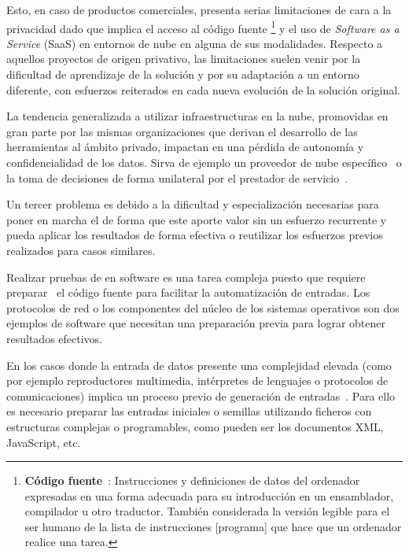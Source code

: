 \documentclass[10pt,conference,a4paper]{IEEEtran}
\begin{document}
Esto, en caso de productos comerciales, presenta serias limitaciones de cara a la privacidad dado que implica el acceso al código fuente
%
\footnote{
\textbf{Código fuente}~\cite{IEEE_SW_standar}:
Instrucciones y definiciones de datos del ordenador expresadas en una forma adecuada para su introducción en un ensamblador, compilador u otro traductor. También considerada la versión legible para el ser humano de la lista de instrucciones [programa] que hace que un ordenador realice una tarea.
}
%
y el uso de \textit{Software as a Service} (SaaS) en entornos de nube en alguna de sus modalidades. Respecto a aquellos proyectos de origen privativo, las limitaciones suelen venir por la dificultad de aprendizaje de la solución y por su adaptación a un entorno diferente, con esfuerzos reiterados en cada nueva evolución de la solución original.

La tendencia generalizada a utilizar infraestructuras en la nube, promovidas en gran parte por las mismas organizaciones que derivan el desarrollo de las herramientas al ámbito privado, impactan en una pérdida de autonomía y confidencialidad de los datos. Sirva de ejemplo un proveedor de nube específico~\cite{google_serv} o la toma de decisiones de forma unilateral por el prestador de servicio~\cite{microsoft_srv}.

Un tercer problema es debido a la dificultad y especialización necesarias para poner en marcha el {\fz} de forma que este aporte valor sin un esfuerzo recurrente y pueda aplicar los resultados de forma efectiva o reutilizar los esfuerzos previos realizados para casos similares.

Realizar pruebas de {\fz} en software es una tarea compleja puesto que requiere preparar~\cite{fuzzing_SOA} el código fuente para facilitar la automatización de entradas. Los protocolos de red o los componentes del núcleo de los sistemas operativos son dos ejemplos de software que necesitan una preparación previa para lograr obtener resultados efectivos.

En los casos donde la entrada de datos presente una complejidad elevada (como por ejemplo reproductores multimedia, intérpretes de lenguajes o protocolos de comunicaciones) implica un proceso previo de generación de entradas~\cite{fuzzing_SOA}. Para ello es necesario preparar las entradas iniciales o semillas utilizando ficheros con estructuras complejas o programables, como pueden ser los documentos XML, JavaScript, etc.
\end{document}
